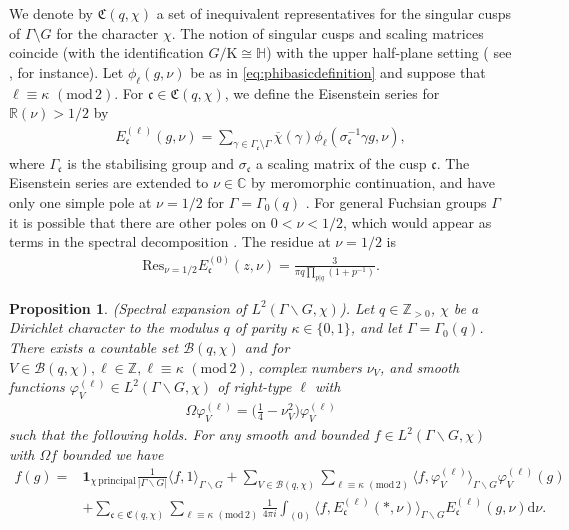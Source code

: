 \documentclass[12pt]{amsart}
\newtheorem{proposition}[theorem]{Proposition}
\theoremstyle{definition}
\theoremstyle{remark}
\numberwithin{equation}{section}
\newcommand{\C}{{\mathbb C}}
\newcommand{\R}{{\mathbb R}}
\newcommand{\Z}{{\mathbb Z}}
\newcommand{\1}{{\mathbf 1}}
\renewcommand{\d}{\mathrm d}
\renewcommand{\pmod}[1]{\,\,(\mathrm{mod}\,{#1})}
\begin{document}
 We denote by $\mathfrak{C}(q,\chi)$ a set of inequivalent representatives for the singular cusps of $\Gamma \setminus G$ for the character $\chi$. The notion of singular cusps and scaling  matrices coincide (with the identification $G/\mathrm{K} \cong \mathbb{H}$) with the upper half-plane setting ( see \cite[Section 4.1]{Drappeau}, for instance). 
 Let $ \phi_{\ell}(g,\nu)$ be as  in \eqref{eq:phibasicdefinition} and suppose that $\ell \equiv \kappa \pmod{2}$. For $\mathfrak{c}\in \mathfrak{C}(q,\chi)$, we define the Eisenstein series for $\R(\nu)>1/2$ by
\begin{align*}
    E_{\mathfrak{c}}^{(\ell)}(g,\nu)=\sum_{\gamma\in \Gamma_{\mathfrak{c}}\setminus \Gamma } \overline{\chi}(\gamma) \phi_\ell (\sigma_{\mathfrak{c}}^{-1} \gamma g, \nu),
\end{align*}
where $\Gamma_{\mathfrak{c}}$ is the stabilising group and $\sigma_{\mathfrak{c}}$ a scaling matrix of the cusp $\mathfrak{c}$. The Eisenstein series are extended to $\nu \in \C$ by meromorphic continuation, and have only one simple pole at $\nu=1/2$ for $\Gamma=\Gamma_0(q)$ \cite[Lemma 3.7]{deshoullieriwaniec}. For general Fuchsian groups $\Gamma$ it is possible that there are other poles on $0< \nu < 1/2$, which would appear as terms in the spectral decomposition \cite[Chapter 7]{IwaniecBook}.   The residue at $\nu=1/2$ is
\begin{align*}
    \mathrm{Res}_{\nu=1/2}  E^{(0)}_{\mathfrak{c}}(z,\nu) = \frac{3}{\pi q  \prod_{p|q} (1+p^{-1})}.
\end{align*}
\begin{proposition}\label{prop:specdecompL2}\emph{(Spectral expansion of $L^2(\Gamma \backslash G,\chi)$)}.
  Let $q\in \Z_{>0}$, $\chi$ be a Dirichlet character to the modulus $q$ of parity $\kappa \in \{0,1\}$, and let $\Gamma=\Gamma_0(q)$.  There exists a countable set  $\mathcal{B}(q,\chi) $ and for $V \in \mathcal{B}(q,\chi),\ell\in \Z, \ell \equiv \kappa \pmod{2}$, complex numbers $\nu_V$, and smooth functions $\varphi^{(\ell)}_V \in L^2(\Gamma \backslash G,\chi)$ of right-type $\ell$ with \begin{align}\label{eq:varphieigenfuncOmega}
        \Omega \varphi^{(\ell)}_V=\bigg(\frac{1}{4}-\nu_V^2\bigg)\varphi^{(\ell)}_V
    \end{align} 
    such that the following holds. For any smooth and bounded $f\in L^2(\Gamma \backslash G,\chi)$ with $\Omega f$ bounded we have
    \begin{align*}
        f(g)= &\mathbf{1}_{\chi \,\mathrm{principal}}\frac{1}{|\Gamma \backslash G|} \langle f ,1 \rangle_{\Gamma \backslash G} +\sum_{V \in \mathcal{B}(q,\chi)} \sum_{\ell\equiv \kappa \pmod{2}}\langle f ,\varphi_V^{(\ell)} \rangle_{\Gamma \backslash G}  \varphi_V^{(\ell)}(g)\\
        &+\sum_{\mathfrak{c}\in \mathfrak{C}(q,\chi)} \sum_{\ell\equiv \kappa \pmod{2}} \frac{1}{4 \pi i} \int_{(0)} \langle f, E^{(\ell)}_{\mathfrak{c}}(*,\nu) \rangle_{\Gamma \backslash G}  E^{(\ell)}_{\mathfrak{c}}(g,\nu) \d \nu.
    \end{align*}
\end{proposition}
\end{document}
